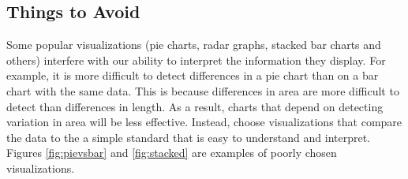 \subsection*{Things to Avoid} %

Some popular visualizations (pie charts, radar graphs, stacked bar charts and others) interfere with our ability to interpret the information they display.
For example, it is more difficult to detect differences in a pie chart than on a bar chart with the same data.
This is because differences in area are more difficult to detect than differences in length.
As a result, charts that depend on detecting variation in area will be less effective.
Instead, choose visualizations that compare the data to the a simple standard that is easy to understand and interpret.
Figures \ref{fig:pievsbar} and \ref{fig:stacked} are examples of poorly chosen visualizations.

